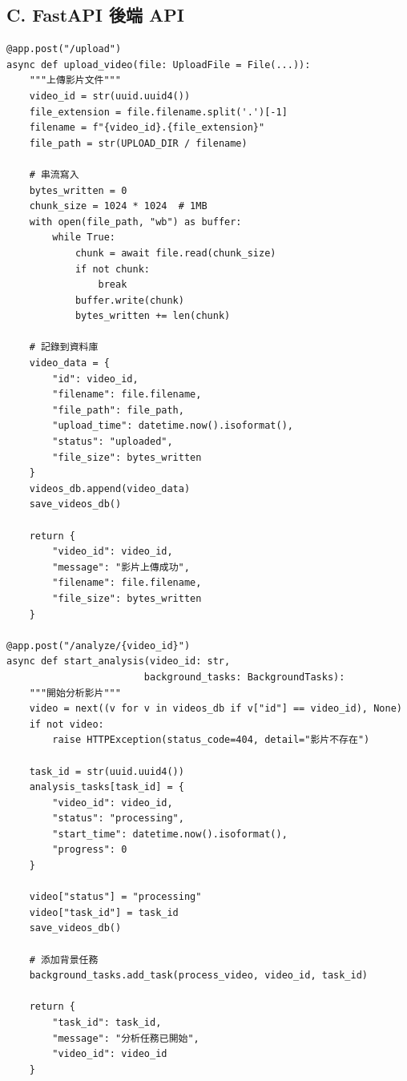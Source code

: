 \documentclass[a4paper,14pt,oneside]{article}
\begin{document}
\subsection*{C. FastAPI 後端 API}

\begin{lstlisting}[style=pythonstyle, caption={FastAPI 主要端點實作}]
@app.post("/upload")
async def upload_video(file: UploadFile = File(...)):
    """上傳影片文件"""
    video_id = str(uuid.uuid4())
    file_extension = file.filename.split('.')[-1]
    filename = f"{video_id}.{file_extension}"
    file_path = str(UPLOAD_DIR / filename)
    
    # 串流寫入
    bytes_written = 0
    chunk_size = 1024 * 1024  # 1MB
    with open(file_path, "wb") as buffer:
        while True:
            chunk = await file.read(chunk_size)
            if not chunk:
                break
            buffer.write(chunk)
            bytes_written += len(chunk)
    
    # 記錄到資料庫
    video_data = {
        "id": video_id,
        "filename": file.filename,
        "file_path": file_path,
        "upload_time": datetime.now().isoformat(),
        "status": "uploaded",
        "file_size": bytes_written
    }
    videos_db.append(video_data)
    save_videos_db()
    
    return {
        "video_id": video_id,
        "message": "影片上傳成功",
        "filename": file.filename,
        "file_size": bytes_written
    }

@app.post("/analyze/{video_id}")
async def start_analysis(video_id: str, 
                        background_tasks: BackgroundTasks):
    """開始分析影片"""
    video = next((v for v in videos_db if v["id"] == video_id), None)
    if not video:
        raise HTTPException(status_code=404, detail="影片不存在")
    
    task_id = str(uuid.uuid4())
    analysis_tasks[task_id] = {
        "video_id": video_id,
        "status": "processing",
        "start_time": datetime.now().isoformat(),
        "progress": 0
    }
    
    video["status"] = "processing"
    video["task_id"] = task_id
    save_videos_db()
    
    # 添加背景任務
    background_tasks.add_task(process_video, video_id, task_id)
    
    return {
        "task_id": task_id,
        "message": "分析任務已開始",
        "video_id": video_id
    }
\end{lstlisting}
\end{document}

